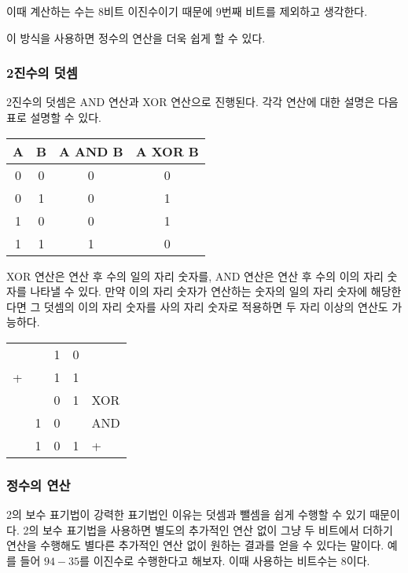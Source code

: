 \documentclass{article}
\begin{document}
이때 계산하는 수는 8비트 이진수이기 때문에 9번째 비트를 제외하고 생각한다.

이 방식을 사용하면 정수의 연산을 더욱 쉽게 할 수 있다.

\subsubsection{2진수의 덧셈}

2진수의 덧셈은 AND 연산과 XOR 연산으로 진행된다. 각각 연산에 대한 설명은 다음 표로 설명할
수 있다.

\begin{center}
    \begin{tabular}{cc|cc}
        A & B & A AND B & A XOR B \\
        \hline
        0 & 0 & 0 & 0 \\
        0 & 1 & 0 & 1 \\
        1 & 0 & 0 & 1 \\
        1 & 1 & 1 & 0
    \end{tabular}
\end{center}

XOR 연산은 연산 후 수의 일의 자리 숫자를, AND 연산은 연산 후 수의 이의 자리 숫자를 나타낼 수
있다. 만약 이의 자리 숫자가 연산하는 숫자의 일의 자리 숫자에 해당한다면 그 덧셈의 이의 자리
숫자를 사의 자리 숫자로 적용하면 두 자리 이상의 연산도 가능하다.

\begin{center}
    \begin{tabular}{ccccl}
          &   & 1 & 0 & \\
        + &   & 1 & 1 & \\
        \hline
          &   & 0 & 1 & XOR \\
          & 1 & 0 &   & AND \\
        \hline
          & 1 & 0 & 1 & +
    \end{tabular}
\end{center}

\subsubsection{정수의 연산}

2의 보수 표기법이 강력한 표기법인 이유는 덧셈과 뺄셈을 쉽게 수행할 수 있기 때문이다.
2의 보수 표기법을 사용하면 별도의 추가적인 연산 없이 그냥 두 비트에서 더하기 연산을 수행해도
별다른 추가적인 연산 없이 원하는 결과를 얻을 수 있다는 말이다. 예를 들어 $94 - 35$를 이진수로
수행한다고 해보자. 이때 사용하는 비트수는 8이다.
\end{document}
